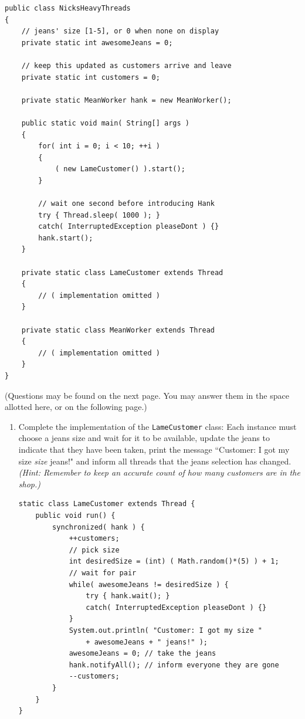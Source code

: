 \documentclass[11pt]{article}
\newenvironment{answer}{\large\lstset{basicstyle=\tiny\ttfamily}\color{white}}{}
\newenvironment{answer}{\large\lstset{basicstyle=\large\ttfamily}\color{red}}{}
\begin{document}
\begin{enumerate}
\begin{lstlisting}
public class NicksHeavyThreads
{
	// jeans' size [1-5], or 0 when none on display
    private static int awesomeJeans = 0;
    
	// keep this updated as customers arrive and leave
    private static int customers = 0;
    
    private static MeanWorker hank = new MeanWorker();
    
    public static void main( String[] args )
    {
        for( int i = 0; i < 10; ++i )
        {
            ( new LameCustomer() ).start();
        }

		// wait one second before introducing Hank
        try { Thread.sleep( 1000 ); }
        catch( InterruptedException pleaseDont ) {}
        hank.start();
    }
    
    private static class LameCustomer extends Thread
    {
        // ( implementation omitted )
    }
    
    private static class MeanWorker extends Thread
    {
        // ( implementation omitted )
    }
}
\end{lstlisting}
\scriptsize
(Questions may be found on the next page. You may answer them in the space allotted here, or on the following page.)
\normalsize

    \begin{enumerate}

	\pagebreak

    \item Complete the implementation of the \texttt{LameCustomer} class: Each instance
          must choose a jeans size and wait for it to be available, update the
          jeans to indicate that they have been taken, print the message
          ``Customer: I got my size \emph{size} jeans!" and inform all threads
          that the jeans selection has changed. \\
		  \textit{(Hint: Remember to keep an
          accurate count of how many customers are in the shop.)}

\begin{answer}
\begin{lstlisting}
static class LameCustomer extends Thread {
    public void run() {
        synchronized( hank ) {
            ++customers;
			// pick size
            int desiredSize = (int) ( Math.random()*(5) ) + 1;
			// wait for pair
            while( awesomeJeans != desiredSize ) {
                try { hank.wait(); }
                catch( InterruptedException pleaseDont ) {}
            }
            System.out.println( "Customer: I got my size "
                + awesomeJeans + " jeans!" );
            awesomeJeans = 0; // take the jeans
            hank.notifyAll(); // inform everyone they are gone
            --customers;
        }
    }
}
\end{lstlisting}
\end{answer}


\end{enumerate}
\end{enumerate}
\end{document}
